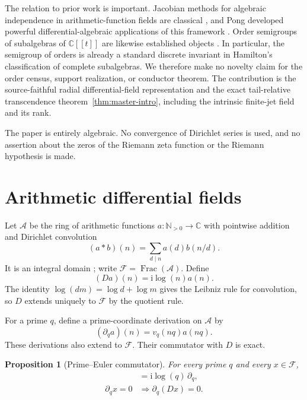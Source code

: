 \documentclass[11pt]{article}
\newtheorem{proposition}[theorem]{Proposition}
\theoremstyle{definition}
\theoremstyle{remark}
\newcommand{\C}{\mathbb C}
\newcommand{\N}{\mathbb N}
\newcommand{\A}{\mathcal A}
\newcommand{\F}{\mathcal F}
\newcommand{\Frac}{\operatorname{Frac}}
\begin{document}
The relation to prior work is important.  Jacobian methods for algebraic independence in
arithmetic-function fields are classical \cite{ShapiroSparer1986}, and Pong developed powerful
differential-algebraic applications of this framework \cite{Pong2016}.  Order semigroups of
subalgebras of $\C[[t]]$ are likewise established objects
\cite{AssiGarciaSanchezMicale2017,Hamilton2020}.  In particular, the semigroup of orders is already
a standard discrete invariant in Hamilton's classification of complete subalgebras.  We therefore
make no novelty claim for the order census, support realization, or conductor theorem.  The
contribution is the source-faithful radial differential-field representation and the exact
tail-relative transcendence theorem~\ref{thm:master-intro}, including the intrinsic finite-jet
field and its rank.

The paper is entirely algebraic.  No convergence of Dirichlet series is used, and no assertion
about the zeros of the Riemann zeta function or the Riemann hypothesis is made.

\section{Arithmetic differential fields}\label{sec:arithmetic}

Let $\A$ be the ring of arithmetic functions $a:\N_{>0}\to\C$ with pointwise addition and
Dirichlet convolution
\begin{equation}\label{eq:dirichlet-convolution}
 (a*b)(n)=\sum_{d\mid n}a(d)b(n/d).
\end{equation}
It is an integral domain \cite{CashwellEverett1959}; write $\F=\Frac(\A)$.  Define
\begin{equation}\label{eq:log-derivation}
 (Da)(n)=\mathrm i\log(n)a(n).
\end{equation}
The identity $\log(dm)=\log d+\log m$ gives the Leibniz rule for convolution, so $D$ extends
uniquely to $\F$ by the quotient rule.

For a prime $q$, define a prime-coordinate derivation on $\A$ by
\begin{equation}\label{eq:prime-derivation}
 (\partial_q a)(n)=v_q(nq)a(nq).
\end{equation}
These derivations also extend to $\F$.  Their commutator with $D$ is exact.

\begin{proposition}[Prime--Euler commutator]\label{prop:commutator}
For every prime $q$ and every $x\in\F$,
\begin{align}
 [\partial_q,D]&=\mathrm i\log(q)\,\partial_q,
                                                        \label{eq:commutator}\\
 \partial_qx=0&\Longrightarrow \partial_q(Dx)=0.       \label{eq:no-activation}
\end{align}
\end{proposition}
\end{document}
